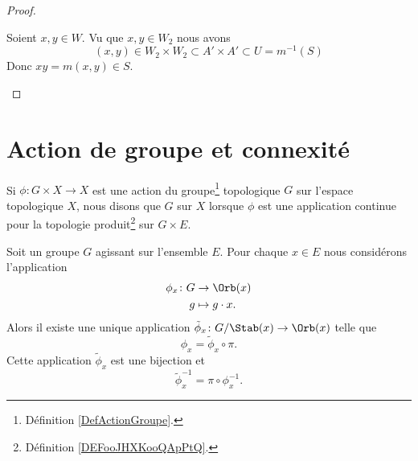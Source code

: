 \begin{proof}
\begin{subproof}
		\spitem[\( WW\subset S\)]
		Soient \( x,y\in W\). Vu que \( x,y\in W_2\) nous avons
		\begin{equation}
			(x,y)\in W_2\times W_2\subset A'\times A'\subset U=m^{-1}(S)
		\end{equation}
		Donc \( xy=m(x,y)\in S\).
	\end{subproof}
\end{proof}


\section{Action de groupe et connexité}

\begin{definition}	\label{DEFooFRFGooPkzoyV}
	Si \(\phi \colon G\times X\to X  \) est une action du groupe\footnote{Définition \ref{DefActionGroupe}.} topologique \( G\) sur l'espace topologique \( X\), nous disons que \( G\)  sur \( X\) lorsque \( \phi\) est une application continue pour la topologie produit\footnote{Définition \ref{DEFooJHXKooQApPtQ}.} sur \( G\times E\).
\end{definition}


\begin{proposition}	\label{PROPooVWHJooXaMvTj}
	Soit un groupe \( G\) agissant sur l'ensemble \( E\). Pour chaque \( x\in E\) nous considérons l'application
	\begin{equation}
		\begin{aligned}
			\phi_x\colon G & \to \Orb(x)       \\
			g              & \mapsto g\cdot x.
		\end{aligned}
	\end{equation}
	Alors il existe une unique application \( \tilde \phi_x \colon G/\Stab(x)\to \Orb(x) \) telle que
	\begin{equation}
		\phi_x=\tilde \phi_x\circ\pi.
	\end{equation}
	Cette application \( \tilde \phi_x\) est une bijection et
	\begin{equation}		\label{EQooIOGMooEjMaCP}
		\tilde \phi_x^{-1}=\pi\circ\phi_x^{-1}.
	\end{equation}
\end{proposition}

